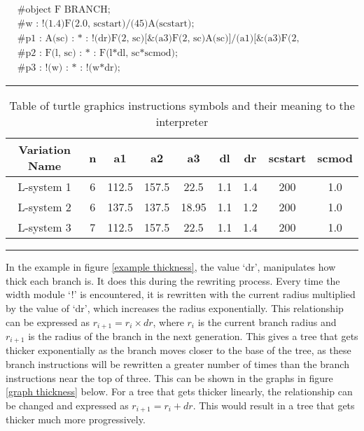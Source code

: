 \begin{singlespace}
\begin{equation}
\begin{aligned}
	&\textrm{\#object F BRANCH;}\\
	&\textrm{\#w : !(1.4)F(2.0, scstart)/(45)A(scstart);}\\
	&\textrm{\#p1 : A(sc) : * : !(dr)F(2, sc)[\&(a3)F(2, sc)A(sc)]/(a1)[\&(a3)F(2, sc)A(sc)]/(a2)[\&(a3)F(2, sc)A(sc)];}\\
	&\textrm{\#p2 : F(l, sc) : * : F(l*dl, sc*scmod);}\\
	&\textrm{\#p3 : !(w) : * : !(w*dr);}
\end{aligned}
\end{equation} \label{parametric L-system results}
\end{singlespace}

\vspace{10mm}
\hrule
\begin{table}[h!]
\centering
\begin{tabular}{ | c | c | c | c | c | c | c | c | c | }
\hline
	Variation Name & n & a1 & a2 & a3 & dl & dr & scstart & scmod\\  
\hline
\hline
	L-system 1  & 6 & 112.5 & 157.5 & 22.5 & 1.1 & 1.4 & 200 & 1.0 \\
\hline
	L-system 2  & 6 & 137.5 & 137.5 & 18.95 & 1.1 & 1.2 & 200 & 1.0 \\
\hline
	L-system 3  & 7 & 112.5 & 157.5 & 22.5 & 1.1 & 1.4 & 200 & 1.0 \\
\hline
\end{tabular}
\caption{Table of turtle graphics instructions symbols and their meaning to the interpreter}
\label{L-system params}
\end{table}
\FloatBarrier
\hrule

\vspace{10mm} 

\noindent
In the example in figure \ref{example thickness}, the value `dr', manipulates how thick each branch is. It does this during the rewriting process. Every time the width module `!' is encountered, it is rewritten with the current radius multiplied by the value of `dr', which increases the radius exponentially. This relationship can be expressed as $r_{i+1} = r_i \times dr$, where $r_i$ is the current branch radius and $r_{i+1}$ is the radius of the branch in the next generation. This gives a tree that gets thicker exponentially as the branch moves closer to the base of the tree, as these branch instructions will be rewritten a greater number of times than the branch instructions near the top of three. This can be shown in the graphs in figure \ref{graph thickness} below. For a tree that gets thicker linearly, the relationship can be changed and expressed as $r_{i+1} = r_i + dr$. This would result in a tree that gets thicker much more progressively.

